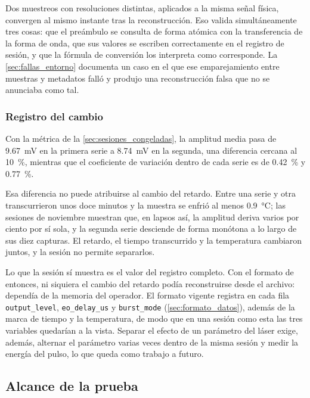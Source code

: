 Dos muestreos con resoluciones distintas, aplicados a la misma señal
física, convergen al mismo instante tras la reconstrucción. Eso valida
simultáneamente tres cosas: que el preámbulo se consulta de forma
atómica con la transferencia de la forma de onda, que sus valores se
escriben correctamente en el registro de sesión, y que la fórmula de
conversión los interpreta como corresponde. La
\cref{sec:fallas_entorno} documenta un caso en el que ese emparejamiento
entre muestras y metadatos falló y produjo una reconstrucción falsa que
no se anunciaba como tal.

\subsubsection{Registro del cambio}
\label{sec:discriminacion}

Con la métrica de la \cref{sec:sesiones_congeladas}, la amplitud media
pasa de \SI{9.67}{\milli\volt} en la primera serie a
\SI{8.74}{\milli\volt} en la segunda, una diferencia cercana al
\SI{10}{\percent}, mientras que el coeficiente de variación dentro de
cada serie es de \SI{0.42}{\percent} y \SI{0.77}{\percent}.

Esa diferencia no puede atribuirse al cambio del retardo. Entre una
serie y otra transcurrieron unos doce minutos y la muestra se enfrió al
menos \SI{0.9}{\celsius}; las sesiones de noviembre muestran que, en
lapsos así, la amplitud deriva varios por ciento por sí sola, y la
segunda serie desciende de forma monótona a lo largo de sus diez
capturas. El retardo, el tiempo transcurrido y la temperatura cambiaron
juntos, y la sesión no permite separarlos.

Lo que la sesión sí muestra es el valor del registro completo. Con el
formato de entonces, ni siquiera el cambio del retardo podía
reconstruirse desde el archivo: dependía de la memoria del operador. El
formato vigente registra en cada fila \texttt{output\_level},
\texttt{eo\_delay\_us} y \texttt{burst\_mode}
(\cref{sec:formato_datos}), además de la marca de tiempo y la
temperatura, de modo que en una sesión como esta las tres variables
quedarían a la vista. Separar el efecto de un parámetro del láser
exige, además, alternar el parámetro varias veces dentro de la misma
sesión y medir la energía del pulso, lo que queda como trabajo a
futuro.

\subsection{Alcance de la prueba}
\label{sec:alcance_prueba}

